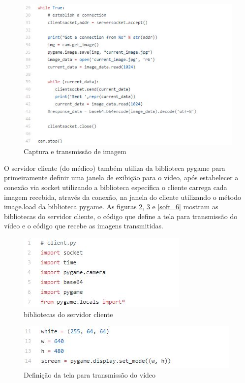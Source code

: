 \begin{figure}[H]
	\centering	\includegraphics[keepaspectratio=true,scale=1]{figuras/2_2_captura_server_transm.jpg}
	\caption{Captura e transmissão de imagem}
	\label{soft_3}
\end{figure}

O servidor cliente (do médico) também utiliza da biblioteca pygame para primeiramente definir uma janela de exibição para o vídeo, após estabelecer a conexão via socket utilizando a biblioteca específica o cliente carrega cada imagem recebida, através da conexão, na janela do cliente utilizando o método image.load da biblioteca pygame. As figuras \ref{soft_4}, \ref{soft_5} e \ref{soft_6} mostram as bibliotecas do servidor cliente, o código que define a tela para transmissão do vídeo e o código que recebe as imagens transmitidas.

\begin{figure}[H]
	\centering	\includegraphics[keepaspectratio=true,scale=1]{figuras/2_3_bibliotecas_client.jpg}
	\caption{bibliotecas do servidor cliente}
	\label{soft_4}
\end{figure}

\begin{figure}[H]
	\centering	\includegraphics[keepaspectratio=true,scale=1]{figuras/2_4_tela_cliente.jpg}
	\caption{Definição da tela para transmissão do vídeo}
	\label{soft_5}
\end{figure}

